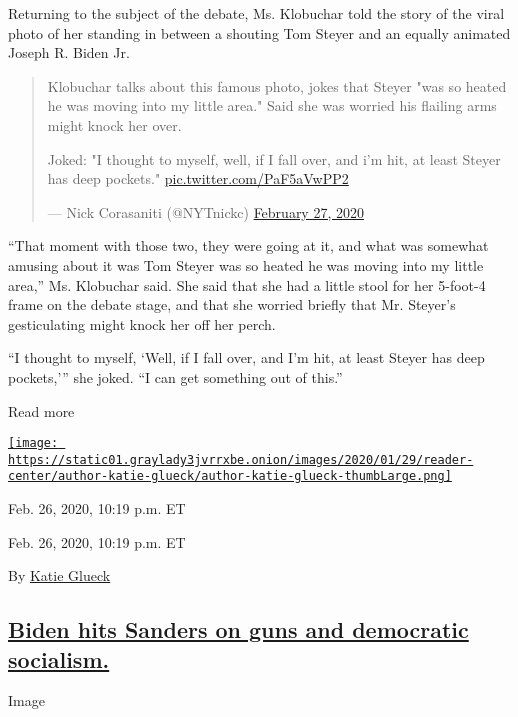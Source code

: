 Returning to the subject of the debate, Ms. Klobuchar told the story of
the viral photo of her standing in between a shouting Tom Steyer and an
equally animated Joseph R. Biden Jr.

\begin{quote}
Klobuchar talks about this famous photo, jokes that Steyer "was so
heated he was moving into my little area." Said she was worried his
flailing arms might knock her over.

Joked: "I thought to myself, well, if I fall over, and i'm hit, at least
Steyer has deep pockets."
\href{https://t.co/PaF5aVwPP2}{pic.twitter.com/PaF5aVwPP2}

--- Nick Corasaniti (@NYTnickc)
\href{https://twitter.com/NYTnickc/status/1232857064965320705?ref_src=twsrc\%5Etfw}{February
27, 2020}
\end{quote}

``That moment with those two, they were going at it, and what was
somewhat amusing about it was Tom Steyer was so heated he was moving
into my little area,'' Ms. Klobuchar said. She said that she had a
little stool for her 5-foot-4 frame on the debate stage, and that she
worried briefly that Mr. Steyer's gesticulating might knock her off her
perch.

``I thought to myself, `Well, if I fall over, and I'm hit, at least
Steyer has deep pockets,''' she joked. ``I can get something out of
this.''

Read more

\href{https://www.nytimes3xbfgragh.onion/by/katie-glueck}{\texttt{[image: https://static01.graylady3jvrrxbe.onion/images/2020/01/29/reader-center/author-katie-glueck/author-katie-glueck-thumbLarge.png]}}

Feb. 26, 2020, 10:19 p.m. ET

Feb. 26, 2020, 10:19 p.m. ET

By \href{https://www.nytimes3xbfgragh.onion/by/katie-glueck}{Katie
Glueck}

\hypertarget{biden-hits-sanders-on-guns-and-democratic-socialism}{%
\subsection{\texorpdfstring{\protect\hyperlink{joe-biden-cnn-town-hall}{Biden
hits Sanders on guns and democratic
socialism.}}{Biden hits Sanders on guns and democratic socialism.}}\label{biden-hits-sanders-on-guns-and-democratic-socialism}}

Image

